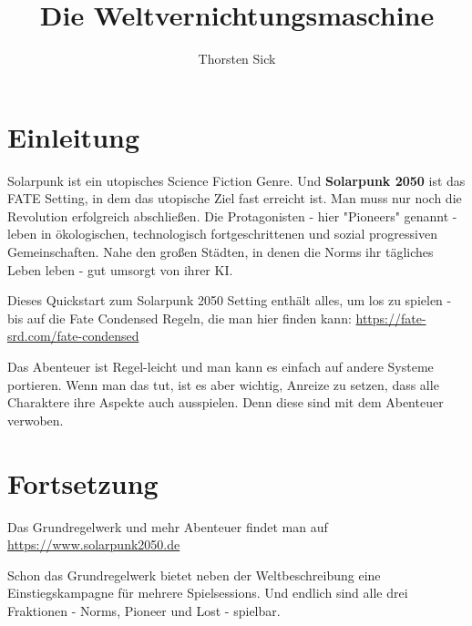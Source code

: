 \documentclass{book}
\title{Die Weltvernichtungsmaschine}
\author{Thorsten Sick}
\begin{document}
%
%
\mbox{}
\thispagestyle{empty}
\BgThispage





\chapter{Einleitung}

Solarpunk ist ein utopisches Science Fiction Genre. Und \textbf{Solarpunk 2050} ist das FATE Setting, in dem das utopische Ziel fast erreicht ist. Man muss nur noch die Revolution erfolgreich abschließen. Die Protagonisten - hier "Pioneers" genannt - leben in ökologischen, technologisch fortgeschrittenen und sozial progressiven Gemeinschaften. Nahe den großen Städten, in denen die Norms ihr tägliches Leben leben - gut umsorgt von ihrer KI.

Dieses Quickstart zum Solarpunk 2050 Setting enthält alles, um los zu spielen - bis auf die Fate Condensed Regeln, die man hier finden kann: \url{https://fate-srd.com/fate-condensed}

Das Abenteuer ist Regel-leicht und man kann es einfach auf andere Systeme portieren. Wenn man das tut, ist es aber wichtig, Anreize zu setzen, dass alle Charaktere ihre Aspekte auch ausspielen. Denn diese sind mit dem Abenteuer verwoben.




\chapter{Fortsetzung}

Das Grundregelwerk und mehr Abenteuer findet man auf \newline \url{https://www.solarpunk2050.de}

Schon das Grundregelwerk bietet neben der Weltbeschreibung eine Einstiegskampagne für mehrere Spielsessions. Und endlich sind alle drei Fraktionen - Norms, Pioneer und Lost - spielbar.
\end{document}
